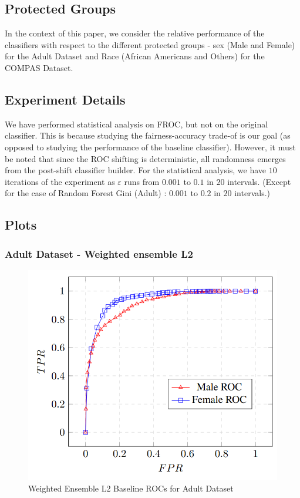 \documentclass{article}
\begin{document}
\subsection{Protected Groups}
In the context of this paper, we consider the relative performance of the classifiers with respect to the different protected groups - sex (Male and Female) for the Adult Dataset and Race (African Americans and Others) for the COMPAS Dataset. 


\subsection{Experiment Details}
We have performed statistical analysis on FROC, but not on the original classifier. This is because studying the fairness-accuracy trade-of is our goal (as opposed to studying the performance of the baseline classifier). However, it must be noted that since the ROC shifting is deterministic, all randomness emerges from the post-shift classifier builder. For the statistical analysis, we have $10$ iterations of the experiment as $\varepsilon$ runs from $0.001$ to $0.1$ in $20$ intervals. (Except for the case of Random Forest Gini (Adult) : $0.001$ to $0.2$ in $20$ intervals.)

\subsection{Plots}
\subsubsection{Adult Dataset - Weighted ensemble L2}
\begin{figure}[!h]
    \centering
    \includegraphics[width=1\linewidth]{Images/WEL2_Adult_ROC.png}
    \caption{Weighted Ensemble L2 Baseline ROCs for Adult Dataset}
    \label{fig:WEL2_Adult_ROC}
\end{figure}
\end{document}
